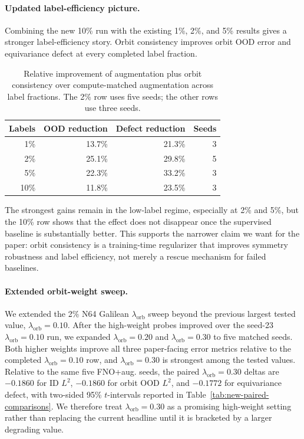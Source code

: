 \paragraph{Updated label-efficiency picture.} Combining the new 10\% run with the existing 1\%, 2\%, and 5\% results gives a stronger label-efficiency story. Orbit consistency improves orbit OOD error and equivariance defect at every completed label fraction.

\begin{table}[t]
\centering
\small
\caption{Relative improvement of augmentation plus orbit consistency over compute-matched augmentation across label fractions. The 2\% row uses five seeds; the other rows use three seeds.}
\label{tab:new-label-efficiency}
\begin{tabular}{rrrr}
\toprule
Labels & OOD reduction & Defect reduction & Seeds \\
\midrule
1\% & 13.7\% & 21.3\% & 3 \\
2\% & 25.1\% & 29.8\% & 5 \\
5\% & 22.3\% & 33.2\% & 3 \\
10\% & 11.8\% & 23.5\% & 3 \\
\bottomrule
\end{tabular}
\end{table}

The strongest gains remain in the low-label regime, especially at 2\% and 5\%, but the 10\% row shows that the effect does not disappear once the supervised baseline is substantially better. This supports the narrower claim we want for the paper: orbit consistency is a training-time regularizer that improves symmetry robustness and label efficiency, not merely a rescue mechanism for failed baselines.

\paragraph{Extended orbit-weight sweep.} We extended the 2\% N64 Galilean \(\lambda_{\mathrm{orb}}\) sweep beyond the previous largest tested value, \(\lambda_{\mathrm{orb}}=0.10\). After the high-weight probes improved over the seed-23 \(\lambda_{\mathrm{orb}}=0.10\) run, we expanded \(\lambda_{\mathrm{orb}}=0.20\) and \(\lambda_{\mathrm{orb}}=0.30\) to five matched seeds. Both higher weights improve all three paper-facing error metrics relative to the completed \(\lambda_{\mathrm{orb}}=0.10\) row, and \(\lambda_{\mathrm{orb}}=0.30\) is strongest among the tested values. Relative to the same five FNO+aug. seeds, the paired \(\lambda_{\mathrm{orb}}=0.30\) deltas are \(-0.1860\) for ID \(L^2\), \(-0.1860\) for orbit OOD \(L^2\), and \(-0.1772\) for equivariance defect, with two-sided 95\% \(t\)-intervals reported in Table~\ref{tab:new-paired-comparisons}. We therefore treat \(\lambda_{\mathrm{orb}}=0.30\) as a promising high-weight setting rather than replacing the current headline until it is bracketed by a larger degrading value.

